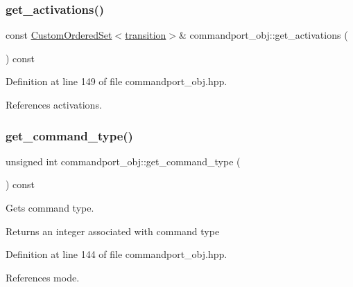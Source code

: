 \subsubsection{\texorpdfstring{get\+\_\+activations()}{get\_activations()}}
{\footnotesize\ttfamily const \hyperlink{classCustomOrderedSet}{Custom\+Ordered\+Set}$<$\hyperlink{classcommandport__obj_aae52b929cff6d84d461b91d88baa3203}{transition}$>$\& commandport\+\_\+obj\+::get\+\_\+activations (\begin{DoxyParamCaption}{ }\end{DoxyParamCaption}) const\hspace{0.3cm}{\ttfamily [inline]}}



Definition at line 149 of file commandport\+\_\+obj.\+hpp.



References activations.

\mbox{\label{classcommandport__obj_ada79dd1f72e9fe0d7526090639096afe}} 
\subsubsection{\texorpdfstring{get\+\_\+command\+\_\+type()}{get\_command\_type()}}
{\footnotesize\ttfamily unsigned int commandport\+\_\+obj\+::get\+\_\+command\+\_\+type (\begin{DoxyParamCaption}{ }\end{DoxyParamCaption}) const\hspace{0.3cm}{\ttfamily [inline]}}



Gets command type. 

\begin{DoxyReturn}{Returns}
an integer associated with command type 
\end{DoxyReturn}


Definition at line 144 of file commandport\+\_\+obj.\+hpp.



References mode.

\mbox{\label{classcommandport__obj_a746c7362dd398aa7f7136f9a93153837}} 
